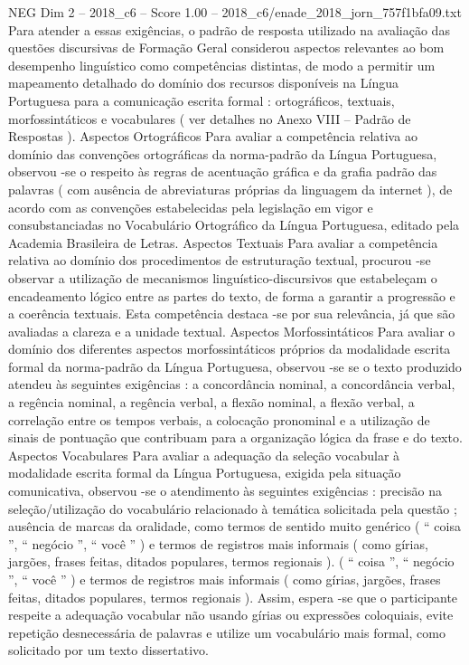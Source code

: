 \begin{textsample}{NEG Dim 2 – 2018\_c6 – Score 1.00 – 2018\_c6/enade\_2018\_jorn\_757f1bfa09.txt}
Para atender a essas exigências, o padrão de resposta utilizado na avaliação das questões discursivas de Formação Geral considerou aspectos relevantes ao bom desempenho linguístico como competências distintas, de modo a permitir um mapeamento detalhado do domínio dos recursos disponíveis na Língua Portuguesa para a comunicação escrita formal : ortográficos, textuais, morfossintáticos e vocabulares ( ver detalhes no Anexo VIII – Padrão de Respostas ).
Aspectos Ortográficos Para avaliar a competência relativa ao domínio das convenções ortográficas da norma-padrão da Língua Portuguesa, observou -se o respeito às regras de acentuação gráfica e da grafia padrão das palavras ( com ausência de abreviaturas próprias da linguagem da internet ), de acordo com as convenções estabelecidas pela legislação em vigor e consubstanciadas no Vocabulário Ortográfico da Língua Portuguesa, editado pela Academia Brasileira de Letras.
Aspectos Textuais Para avaliar a competência relativa ao domínio dos procedimentos de estruturação textual, procurou -se observar a utilização de mecanismos linguístico-discursivos que estabeleçam o encadeamento lógico entre as partes do texto, de forma a garantir a progressão e a coerência textuais.
Esta competência destaca -se por sua relevância, já que são avaliadas a clareza e a unidade textual.
Aspectos Morfossintáticos Para avaliar o domínio dos diferentes aspectos morfossintáticos próprios da modalidade escrita formal da norma-padrão da Língua Portuguesa, observou -se se o texto produzido atendeu às seguintes exigências : a concordância nominal, a concordância verbal, a regência nominal, a regência verbal, a flexão nominal, a flexão verbal, a correlação entre os tempos verbais, a colocação pronominal e a utilização de sinais de pontuação que contribuam para a organização lógica da frase e do texto.
Aspectos Vocabulares Para avaliar a adequação da seleção vocabular à modalidade escrita formal da Língua Portuguesa, exigida pela situação comunicativa, observou -se o atendimento às seguintes exigências : precisão na seleção/utilização do vocabulário relacionado à temática solicitada pela questão ; ausência de marcas da oralidade, como termos de sentido muito genérico ( “ coisa ”, “ negócio ”, “ você ” ) e termos de registros mais informais ( como gírias, jargões, frases feitas, ditados populares, termos regionais ). ( “ coisa ”, “ negócio ”, “ você ” ) e termos de registros mais informais ( como gírias, jargões, frases feitas, ditados populares, termos regionais ).
Assim, espera -se que o participante respeite a adequação vocabular não usando gírias ou expressões coloquiais, evite repetição desnecessária de palavras e utilize um vocabulário mais formal, como solicitado por um texto dissertativo.

\end{textsample}
